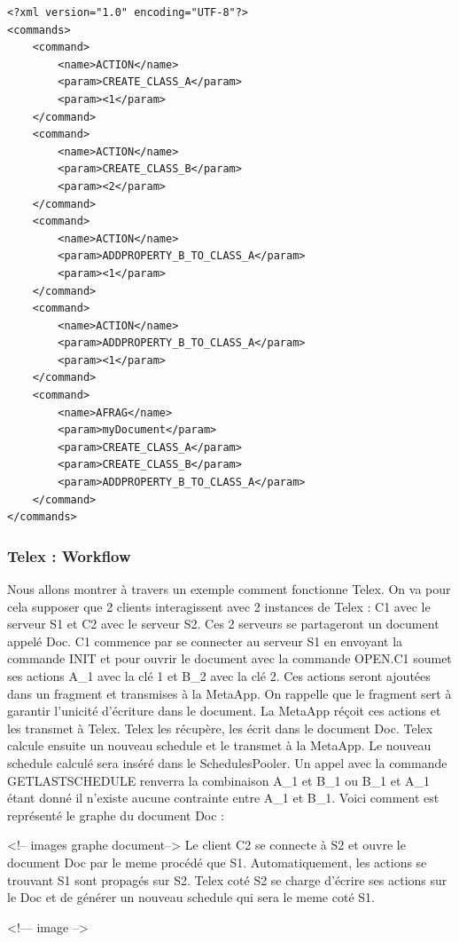 \documentclass[a4paper,14pt]{article}
\begin{document}
\begin{lstlisting}[caption=Un autre exemple de commande permettant de soumettre plusieurs actions à Telex dans un fragment]
<?xml version="1.0" encoding="UTF-8"?>
<commands>
	<command>
		<name>ACTION</name>
		<param>CREATE_CLASS_A</param>
		<param><1</param>
	</command>
	<command>
		<name>ACTION</name>
		<param>CREATE_CLASS_B</param>
		<param><2</param>
	</command>
	<command>
		<name>ACTION</name>
		<param>ADDPROPERTY_B_TO_CLASS_A</param>
		<param><1</param>
	</command>
	<command>
		<name>ACTION</name>
		<param>ADDPROPERTY_B_TO_CLASS_A</param>
		<param><1</param>
	</command>
	<command>
		<name>AFRAG</name>
		<param>myDocument</param>
		<param>CREATE_CLASS_A</param>
		<param>CREATE_CLASS_B</param>
		<param>ADDPROPERTY_B_TO_CLASS_A</param>
	</command>
</commands>
\end{lstlisting}

\subsubsection{Telex : Workflow}
Nous allons montrer à travers un exemple comment fonctionne Telex. On va pour cela supposer que 2 clients interagissent avec 2 instances de Telex : C1 avec le serveur S1 et C2 avec le serveur S2. Ces 2 serveurs se partageront un document appelé Doc.
\newline C1 commence par se connecter au serveur S1 en envoyant la commande INIT et pour ouvrir le document avec la commande OPEN.C1 soumet ses actions A_1 avec la clé 1 et B\_2 avec la clé 2. Ces actions seront ajoutées dans un fragment et transmises à la MetaApp. On rappelle que le fragment sert à garantir l'unicité d'écriture dans le document. La MetaApp réçoit ces actions et les transmet à Telex. Telex les récupère, les écrit dans le document Doc. Telex calcule ensuite un nouveau schedule et le transmet à la MetaApp. Le nouveau schedule calculé sera inséré dans le SchedulesPooler. Un appel avec la commande GETLASTSCHEDULE renverra la combinaison A_1 et B_1 ou B_1 et A_1 étant donné il n'existe aucune contrainte entre A_1 et B_1. Voici comment est représenté le graphe du document Doc :

<!-- images graphe document-->
Le client C2 se connecte à S2 et ouvre le document Doc par le meme procédé que S1. Automatiquement, les actions se trouvant S1 sont propagés sur S2. Telex coté S2 se charge d'écrire ses actions sur le Doc et de générer un nouveau schedule qui sera le meme coté S1. 

<!--- image -->
\end{document}
